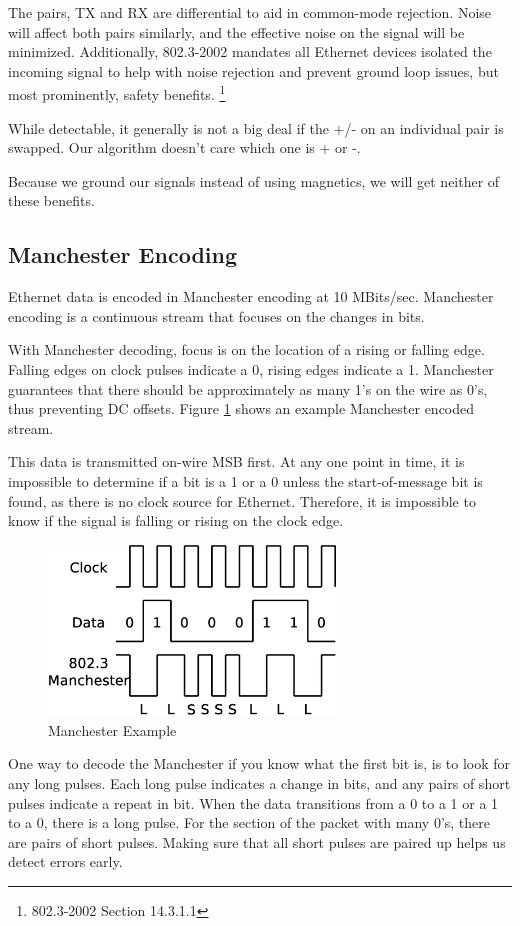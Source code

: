 \documentclass[13pt]{ltxdoc}
\begin{document}
The pairs, TX and RX are differential to aid in common-mode rejection.  Noise
will affect both pairs similarly, and the effective noise on the signal will be minimized.
Additionally, 802.3-2002 mandates all Ethernet devices isolated
the incoming signal to help with noise rejection and prevent ground loop issues, but
most prominently, safety benefits.  \footnote{802.3-2002 Section 14.3.1.1}

While detectable, it generally is not a big deal if the +/- on an individual pair
is swapped.  Our algorithm doesn't care which one is + or -.

Because we ground our signals instead of using magnetics, we will get neither of these
benefits.

\subsection{Manchester Encoding}
Ethernet data is encoded in Manchester encoding at 10 MBits/sec.  Manchester encoding
is a continuous stream that focuses on the changes in bits.

With Manchester decoding, focus is on the location of a rising or falling edge.  Falling 
edges on clock pulses indicate a 0, rising edges indicate a 1.  Manchester guarantees that there
should be approximately as many 1's on the wire as 0's, thus preventing DC offsets.  Figure \ref{manchester}
shows an example Manchester encoded stream.  

This data is transmitted on-wire MSB first.  At any one point in time, it is impossible to
determine if a bit is a 1 or a 0 unless the start-of-message bit is found, as there is no
clock source for Ethernet.  Therefore, it is impossible to know if the signal is falling or
rising on the clock edge.


\begin{figure}
    \centering
    \includegraphics[width=3.0in]{manchester}
    \caption{Manchester Example}
    \label{manchester}
\end{figure}

One way to decode the Manchester if you know what the first bit is, is to look for any long pulses.
Each long pulse indicates a change in bits, and any pairs of short pulses indicate a repeat in bit. 
When the data transitions from a 0 to a 1 or a 1 to a 0, there is a long pulse. For
the section of the packet with many 0's, there are pairs of short pulses.  Making sure that all
short pulses are paired up helps us detect errors early. 
\end{document}
